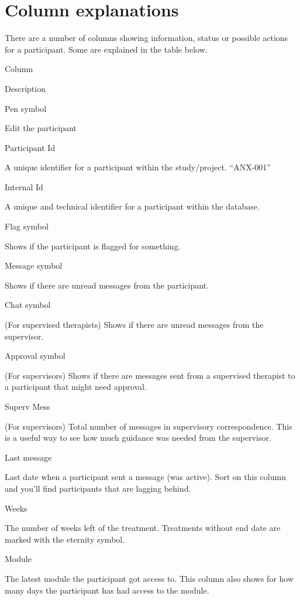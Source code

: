 \documentclass[]{book}
\begin{document}
\hypertarget{column-explanations}{%
\section{Column explanations}\label{column-explanations}}

There are a number of columns showing information, status or possible actions for a participant. Some are explained in the table below.

Column

Description

Pen symbol

Edit the participant

Participant Id

A unique identifier for a participant within the study/project. ``ANX-001''

Internal Id

A unique and technical identifier for a participant within the database.

Flag symbol

Shows if the participant is flagged for something.

Message symbol

Shows if there are unread messages from the participant.

Chat symbol

(For supervised therapists)
Shows if there are unread messages from the supervisor.

Approval symbol

(For supervisors)
Shows if there are messages sent from a supervised therapist to a participant that might need approval.

Superv Mess

(For supervisors)
Total number of messages in supervisory correspondence. This is a useful way to see how much guidance was needed from the supervisor.

Last message

Last date when a participant sent a message (was active). Sort on this column and you'll find participants that are lagging behind.

Weeks

The number of weeks left of the treatment.
Treatments without end date are marked with the eternity symbol.

Module

The latest module the participant got access to. This column also shows for how many days the participant has had access to the module.
\end{document}
